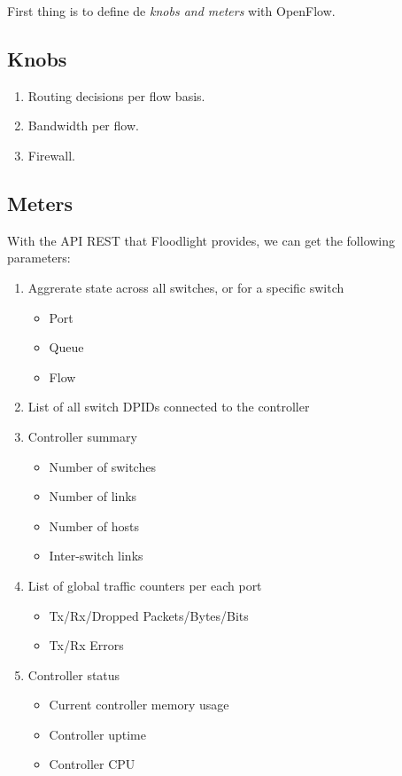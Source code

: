 First thing is to define de \emph{knobs and meters} with OpenFlow.

\subsection{Knobs}

\begin{enumerate}
\item Routing decisions per flow basis.
\item Bandwidth per flow.
\item Firewall.
\end{enumerate}


\subsection{Meters}
With the API REST that Floodlight provides, we can get the following parameters:
\begin{enumerate}
\item Aggrerate state across all switches, or for a specific switch
	\begin{itemize}
	\item Port
	\item Queue
	\item Flow
	\end{itemize}
\item List of all switch DPIDs connected to the controller
\item Controller summary
	\begin{itemize}
	\item Number of switches
	\item Number of links
	\item Number of hosts
	\item Inter-switch links
	\end{itemize}
\item List of global traffic counters per each port
	\begin{itemize}
	\item Tx/Rx/Dropped Packets/Bytes/Bits
	\item Tx/Rx Errors
	\end{itemize}
\item Controller status
	\begin{itemize}
	\item Current controller memory usage
	\item Controller uptime
	\item Controller CPU\\
	\end{itemize}
\end{enumerate}

